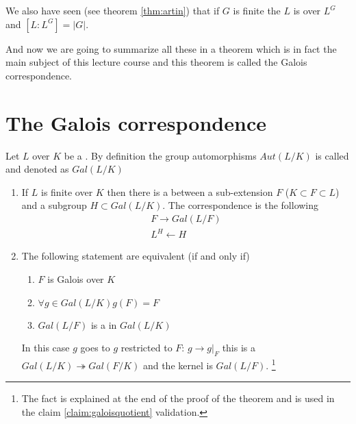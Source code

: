 We also have seen (see theorem \ref{thm:artin}) that if $G$ is finite
the $L$ is  over $L^G$ and
$\left[L:L^G\right] = \left|G\right|$.

And now we are going to summarize all these in a theorem which is in
fact the main subject of this lecture course and this theorem is
called the Galois correspondence. 

\section{The Galois correspondence}

Let $L$ over $K$ be a . By definition the
group automorphisms $Aut\left(L/K\right)$ is called
 and denoted as $Gal\left(L/K\right)$
\begin{theorem}
  \label{thm:galoiscorrespondence}
  \begin{enumerate}
  \item If $L$ is finite over $K$ then there is a
     between a sub-extension $F$
    ($K \subset F \subset L$) and a subgroup $H \subset
    Gal\left(L/K\right)$. The correspondence is the following
    \begin{eqnarray}
      F \rightarrow Gal\left(L/F\right)
      \nonumber \\
      L^H \leftarrow H
      \nonumber
    \end{eqnarray}
  \item The following statement are equivalent (if and only if)
    \begin{enumerate}
    \item $F$ is Galois over $K$ \label{thm:galoiscorrespondence:item2a}
    \item $\forall g \in Gal\left(L/K\right) g\left(F\right) = F$
      \label{thm:galoiscorrespondence:item2b}
    \item $Gal\left(L/F\right)$ is a  in
      $Gal\left(L/K\right)$ 
    \end{enumerate}
    In this case  $g$ goes to $g$ restricted to $F$: $g \to
    \left.g\right|_F$ this is a 
    $Gal\left(L/K\right) \twoheadrightarrow Gal\left(F/K\right)$ and
    the kernel is $Gal\left(L/F\right)$.
    \footnote{
      The fact is explained at the end of the proof of the theorem and
      is used in the claim \ref{claim:galoisquotient} validation. 
    }
  \end{enumerate}

\end{theorem}
